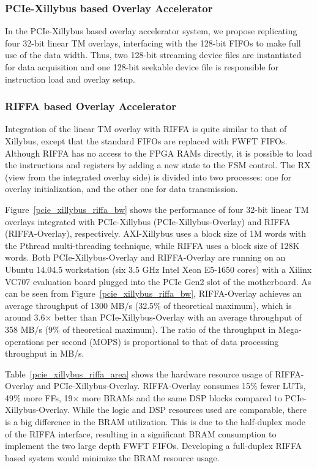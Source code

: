 \subsubsection{PCIe-Xillybus based Overlay Accelerator}
In the PCIe-Xillybus based overlay accelerator system, we propose replicating four 32-bit linear TM overlays, interfacing with the 128-bit FIFOs to make full use of the data width.
Thus, two 128-bit streaming device files are instantiated for data acquisition and one 128-bit seekable device file is responsible for instruction load and overlay setup. 

\subsubsection{RIFFA based Overlay Accelerator}
Integration of the linear TM overlay with RIFFA is quite similar to that of Xillybus, except that the standard FIFOs are replaced with FWFT FIFOs.  
Although RIFFA has no access to the FPGA RAMs directly, it is possible to load the instructions and registers by adding a new state to the FSM control. 
The RX (view from the integrated overlay side) is divided into two processes: one for overlay initialization, and the other one for data transmission. 

Figure~\ref{pcie_xillybus_riffa_bw} shows the performance of four 32-bit linear TM overlays integrated with PCIe-Xillybus (PCIe-Xillybus-Overlay) and RIFFA (RIFFA-Overlay), respectively. 
AXI-Xillybus uses a block size of 1M words with the Pthread multi-threading technique, while RIFFA uses a block size of 128K words.
Both PCIe-Xillybus-Overlay and RIFFA-Overlay are running on an Ubuntu 14.04.5 workstation (six 3.5 GHz Intel Xeon E5-1650 cores) with a Xilinx VC707 evaluation board plugged into the PCIe Gen2 slot of the motherboard. 
As can be seen from Figure~\ref{pcie_xillybus_riffa_bw}, RIFFA-Overlay achieves an average throughput of 1300 MB/s (32.5\% of theoretical maximum), which is around 3.6$\times$ better than PCIe-Xillybus-Overlay with an average throughput of 358 MB/s (9\% of theoretical maximum). 
The ratio of the throughput in Mega-operations per second (MOPS) is proportional to that of data processing throughput in MB/s. 



Table~\ref{pcie_xillybus_riffa_area} shows the hardware resource usage of RIFFA-Overlay and PCIe-Xillybus-Overlay. 
RIFFA-Overlay consumes 15\% fewer LUTs, 49\% more FFs, 19$\times$ more BRAMs and the same DSP blocks compared to PCIe-Xillybus-Overlay. 
While the logic and DSP resources used are comparable, there is a big difference in the BRAM utilization.
This is due to the half-duplex mode of the RIFFA interface, resulting in a significant BRAM consumption to implement the two large depth FWFT FIFOs. 
Developing a full-duplex RIFFA based system would minimize the BRAM resource usage.
 
